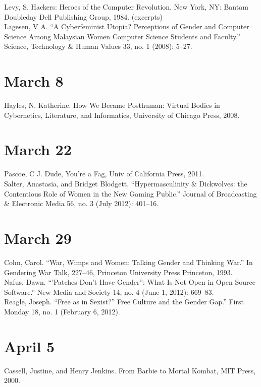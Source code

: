 \documentclass[11pt]{article}
\begin{document}
Levy, S. Hackers: Heroes of the Computer Revolution. New York, NY: Bantam Doubleday Dell Publishing Group, 1984. (excerpts)\\

Lagesen, V A. “A Cyberfeminist Utopia? Perceptions of Gender and Computer Science Among Malaysian Women Computer Science Students and Faculty.” Science, Technology \& Human Values 33, no. 1 (2008): 5–27.




\section{March 8}


Hayles, N. Katherine. How We Became Posthuman: Virtual Bodies in Cybernetics, Literature, and Informatics, University of Chicago Press, 2008.

\section{March 22}

Pascoe, C J. Dude, You're a Fag, Univ of California Press, 2011. \\

Salter, Anastasia, and Bridget Blodgett. “Hypermasculinity \& Dickwolves: the Contentious Role of Women in the New Gaming Public.” Journal of Broadcasting \& Electronic Media 56, no. 3 (July 2012): 401–16. 


\section{March 29}


Cohn, Carol. “War, Wimps and Women: Talking Gender and Thinking War.” In Gendering War Talk, 227–46, Princeton University Press Princeton, 1993.\\

Nafus, Dawn. “'Patches Don't Have Gender”: What Is Not Open in Open Source Software.” New Media and Society 14, no. 4 (June 1, 2012): 669–83. \\

Reagle, Joseph. ``Free as in Sexist?'' Free Culture and the Gender Gap.” First Monday 18, no. 1 (February 6, 2012).


\section{April 5 }

Cassell, Justine, and Henry Jenkins. From Barbie to Mortal Kombat, MIT Press, 2000.
\end{document}
